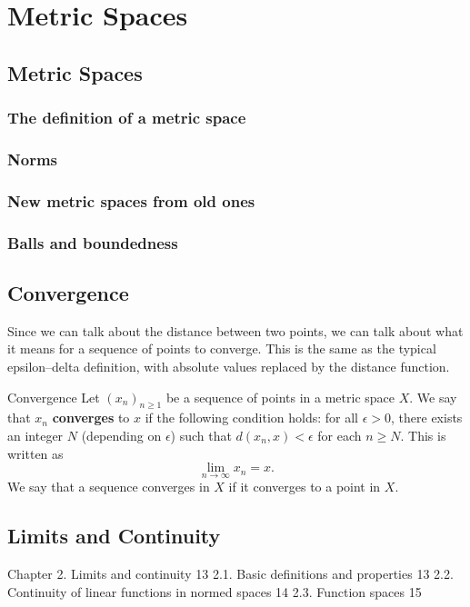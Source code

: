 \chapter{Metric Spaces}
\section{Metric Spaces}
\subsection{The definition of a metric space}





\subsection{Norms}
\subsection{New metric spaces from old ones}
\subsection{Balls and boundedness}
\pagebreak

\section{Convergence}
Since we can talk about the distance between two points, we can talk about what it means for a sequence of points to converge. This is the same as the typical epsilon--delta definition, with absolute values replaced by the distance function.

\begin{defn}{Convergence}{}
Let $(x_n)_{n \ge 1}$ be a sequence of points in a metric space $X$. We say that $x_n$ \textbf{converges} to $x$ if the following condition holds: for all $\epsilon > 0$, there exists an integer $N$ (depending on $\epsilon$) such that $d(x_n,x) < \epsilon$ for each $n \ge N$. This is written as
\[ \lim_{n\to\infty} x_n = x. \]
We say that a sequence converges in $X$ if it converges to a point in $X$.
\end{defn}
\pagebreak

\section{Limits and Continuity}
Chapter 2. Limits and continuity 13
2.1. Basic definitions and properties 13
2.2. Continuity of linear functions in normed spaces 14
2.3. Function spaces 15

